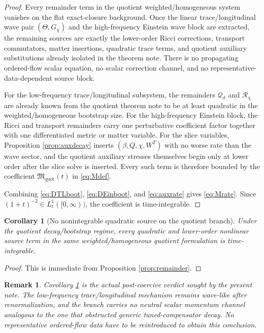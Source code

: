 \documentclass[11pt]{article}
\newtheorem{remark}{Remark}
\newtheorem{corollary}{Corollary}
\begin{document}
\begin{proof}
Every remainder term in the quotient weighted/homogeneous system vanishes on the flat exact-closure background. Once the linear trace/longitudinal wave pair \((\Theta,G_\chi)\) and the high-frequency Einstein wave block are extracted, the remaining sources are exactly the lower-order Ricci corrections, transport commutators, matter insertions, quadratic trace terms, and quotient auxiliary substitutions already isolated in the theorem note. There is no propagating ordered-flow scalar equation, no scalar correction channel, and no representative-data-dependent source block.

For the low-frequency trace/longitudinal subsystem, the remainders \(\mathcal Q_\vartheta\) and \(\mathcal R_\chi\) are already known from the quotient theorem note to be at least quadratic in the weighted/homogeneous bootstrap size. For the high-frequency Einstein block, the Ricci and transport remainders carry one perturbative coefficient factor together with one differentiated metric or matter variable. For the slice variables, Proposition \ref{prop:auxdecay} inserts \((\beta,Q,\chi,W^T)\) with no worse rate than the wave sector, and the quotient auxiliary stresses themselves begin only at lower order after the slice solve is inserted. Every such term is therefore bounded by the coefficient \(\mathfrak M_{\mathrm{quot}}(t)\) in \eqref{eq:Mdef}.

Combining \eqref{eq:DTLboot}, \eqref{eq:DEinboot}, and \eqref{eq:auxrate} gives \eqref{eq:Mrate}. Since \((1+t)^{-2}\in L_t^1([0,\infty))\), the coefficient is time-integrable.
\end{proof}

\begin{corollary}[No nonintegrable quadratic source on the quotient branch]
\label{cor:noquadobs}
Under the quotient decay/bootstrap regime, every quadratic and lower-order nonlinear source term in the same weighted/homogeneous quotient formulation is time-integrable.
\end{corollary}

\begin{proof}
This is immediate from Proposition \ref{prop:remainder}.
\end{proof}

\begin{remark}
Corollary \ref{cor:noquadobs} is the actual post-coercive verdict sought by the present note. The low-frequency trace/longitudinal mechanism remains wave-like after renormalization, and the branch carries no neutral scalar momentum channel analogous to the one that obstructed generic tuned-compensator decay. No representative ordered-flow data have to be reintroduced to obtain this conclusion.
\end{remark}
\end{document}
